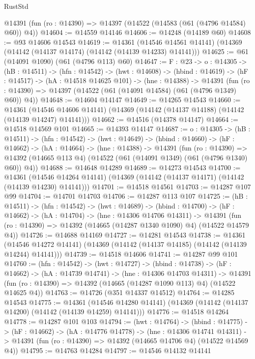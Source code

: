\begin{lexlean}{RustStd}
\begin{coremodule}
  @14391 (fun (ro : @14390) => @14397 (@14522 (@14583 (@61 (@4796 @14584) @60)) @4))
@14604 := @14559 @14146
@14606 := @14248 (@14189 @60)
@14608 := @93 @14606 @14543
@14619 := @14361
    (@14546 @14561 @14141)
    (@14369 (@14142 (@14137 @14174) (@14142 (@14139 @14233) @14141)))
@14625 := @61 (@14091 @1090) (@61 (@4796 @113) @60)
@14647 := {F : @23} ->
  {o : @14305} ->
  (hB : @14511) ->
  (hfn : @14542) ->
  (hwt : @14608) ->
  (hbind : @14619) ->
  (hF : @14517) ->
  (hA : @14518 @14625 @101) ->
  (hne : @14388) ->
  @14391 (fun (ro : @14390) => @14397 (@14522 (@61 (@14091 @14584) (@61 (@4796 @1349) @60)) @4))
@14648 := @14604 @14147
@14649 := @14265 @14543
@14660 := @14361
    (@14546 @14606 @14141)
    (@14369 (@14142 (@14137 @14188) (@14142 (@14139 @14247) @14141)))
@14662 := @14516 (@14378 @14147)
@14664 := @14518 @14569 @101
@14665 := @14393 @14147
@14687 := {o : @14305} ->
  (hB : @14511) ->
  (hfn : @14542) ->
  (hwt : @14649) ->
  (hbind : @14660) ->
  (hF : @14662) ->
  (hA : @14664) ->
  (hne : @14388) ->
  @14391
    (fun (ro : @14390) =>
    @14392 (@14665 @113 @4) (@14522 (@61 (@14091 @1349) (@61 (@4796 @1340) @60)) @4))
@14688 := @14648 @14289
@14689 := @14273 @14543
@14700 := @14361
    (@14546 @14264 @14141)
    (@14369 (@14142 (@14137 @14171) (@14142 (@14139 @14230) @14141)))
@14701 := @14518 @14561
@14703 := @14287 @107 @99
@14704 := @14701 @14703
@14706 := @14287 @113 @107
@14725 := (hB : @14511) ->
  (hfn : @14542) ->
  (hwt : @14689) ->
  (hbind : @14700) ->
  (hF : @14662) ->
  (hA : @14704) ->
  (hne : @14306 @14706 @14311) ->
  @14391 (fun (ro : @14390) => @14392 (@14665 (@14287 @1340 @1090) @4) (@14522 @14579 @4))
@14726 := @14688 @14169
@14727 := @14281 @14543
@14738 := @14361
    (@14546 @14272 @14141)
    (@14369 (@14142 (@14137 @14185) (@14142 (@14139 @14244) @14141)))
@14739 := @14518 @14606
@14741 := @14287 @99 @101
@14760 := (hfn : @14542) ->
  (hwt : @14727) ->
  (hbind : @14738) ->
  (hF : @14662) ->
  (hA : @14739 @14741) ->
  (hne : @14306 @14703 @14311) ->
  @14391 (fun (ro : @14390) => @14392 (@14665 (@14287 @1090 @113) @4) (@14522 @14625 @4))
@14763 := @14726 (@351 @14337 @14512)
@14764 := @14285 @14543
@14775 := @14361
    (@14546 @14280 @14141)
    (@14369 (@14142 (@14137 @14200) (@14142 (@14139 @14259) @14141)))
@14776 := @14518 @14264
@14778 := @14287 @101 @103
@14794 := (hwt : @14764) ->
  (hbind : @14775) ->
  (hF : @14662) ->
  (hA : @14776 @14778) ->
  (hne : @14306 @14741 @14311) ->
  @14391 (fun (ro : @14390) => @14392 (@14665 @14706 @4) (@14522 @14569 @4))
@14795 := @14763 @14284
@14797 := @14546 @14132 @14141

\end{coremodule}
\end{lexlean}
